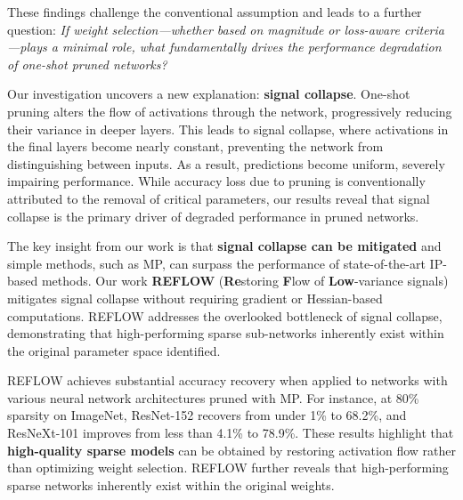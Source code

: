 These findings challenge the conventional assumption and leads to a further question:
\textit{If weight selection—whether based on magnitude or loss-aware criteria—plays a minimal role, what fundamentally drives the performance degradation of one-shot pruned networks?}


Our investigation uncovers a new explanation: \textbf{signal collapse}. One-shot pruning alters the flow of activations through the network, progressively reducing their variance in deeper layers. This leads to signal collapse, where activations in the final layers become nearly constant, preventing the network from distinguishing between inputs. As a result, predictions become uniform, severely impairing performance. While accuracy loss due to pruning is conventionally attributed to the removal of critical parameters, our results reveal that signal collapse is the primary driver of degraded performance in pruned networks.


The key insight from our work is that \textbf{signal collapse can be mitigated} and simple methods, such as MP, can surpass the performance of state-of-the-art IP-based methods. Our work \textbf{REFLOW} (\textbf{Re}storing \textbf{F}low of \textbf{Low}-variance signals) mitigates signal collapse without requiring gradient or Hessian-based computations. REFLOW addresses the overlooked bottleneck of signal collapse, demonstrating that high-performing sparse sub-networks inherently exist within the original parameter space identified.



REFLOW achieves substantial accuracy recovery when applied to networks with various neural network architectures pruned with MP. For instance, at 80\% sparsity on ImageNet, ResNet-152 recovers from under 1\% to 68.2\%, and ResNeXt-101 improves from less than 4.1\% to 78.9\%. These results highlight that \textbf{high-quality sparse models} can be obtained by restoring activation flow rather than optimizing weight selection. REFLOW further reveals that high-performing sparse networks inherently exist within the original weights.


